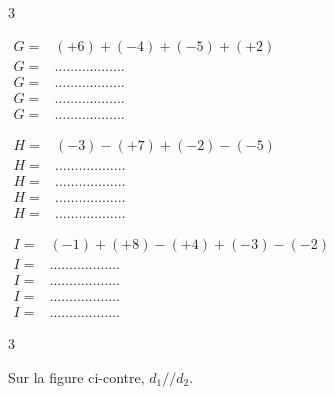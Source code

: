 \documentclass[a4paper]{book}
\begin{document}
{\begin{exerciceNote}{3}
        \noindent    
        \begin{minipage}{0.31\linewidth}
            $\begin{array}{ll}
                G =& (+6) + (-4) + (-5) + (+2) \\[2ex]
                G =& \dots\dots\dots\dots\dots\dots \\[2ex]
                G =& \dots\dots\dots\dots\dots\dots \\[2ex]
                G =& \dots\dots\dots\dots\dots\dots \\[2ex]
                G =& \dots\dots\dots\dots\dots\dots
            \end{array}$
        \end{minipage}
        \hfill \vline \hfill
        \begin{minipage}{0.33\linewidth}
            $\begin{array}{ll}
                H =& (-3) - (+7) + (-2) - (-5) \\[2ex]
                H =& \dots\dots\dots\dots\dots\dots \\[2ex]
                H =& \dots\dots\dots\dots\dots\dots \\[2ex]
                H =& \dots\dots\dots\dots\dots\dots \\[2ex]
                H =& \dots\dots\dots\dots\dots\dots
            \end{array}$
        \end{minipage}
        \hfill \vline \hfill
        \begin{minipage}{0.33\linewidth}
            $\begin{array}{ll}
                I =& (-1) + (+8) - (+4) + (-3) - (-2) \\[2ex]
                I =& \dots\dots\dots\dots\dots\dots \\[2ex]
                I =& \dots\dots\dots\dots\dots\dots \\[2ex]
                I =& \dots\dots\dots\dots\dots\dots \\[2ex]
                I =& \dots\dots\dots\dots\dots\dots
            \end{array}$
        \end{minipage}
    \end{exerciceNote}


\newpage


    \begin{exerciceNote}{3}
        \begin{minipage}{0.35\linewidth}
            Sur la figure ci-contre, $d_1//d_2$.


\end{minipage}
\end{exerciceNote}}
\end{document}
